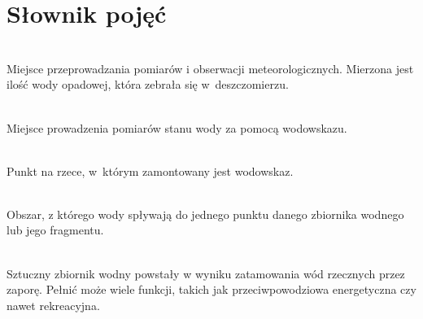 \chapter{Słownik pojęć}
\begin{description}[leftmargin=5cm]
\item[Posterunek opadowy] \hfill \\ 
Miejsce przeprowadzania pomiarów i obserwacji meteorologicznych. Mierzona jest ilość wody opadowej, która zebrała się w~deszczomierzu.
\item[Posterunek wodowskazowy] \hfill \\ 
Miejsce prowadzenia pomiarów stanu wody za pomocą wodowskazu.
\item[Profil wodowskazowy] \hfill \\ 
Punkt na rzece, w~którym zamontowany jest wodowskaz.
\item[Zlewnia] \hfill \\ 
Obszar, z którego wody spływają do jednego punktu danego zbiornika wodnego lub jego fragmentu.
\item[Zbiornik retencyjny] \hfill \\
Sztuczny zbiornik wodny powstały w wyniku zatamowania wód rzecznych przez zaporę. Pełnić może wiele funkcji, takich jak przeciwpowodziowa energetyczna czy nawet rekreacyjna.
\end{description}
